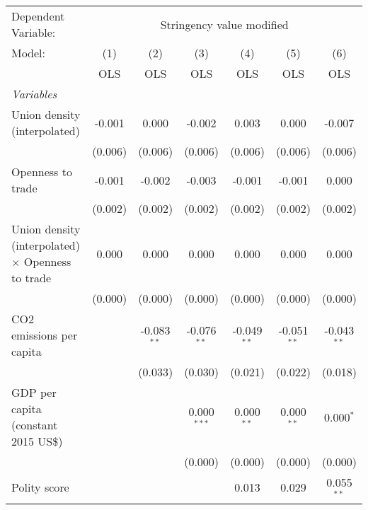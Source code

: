 
\begingroup
\centering
\begin{tabular}{lcccccc}
   \toprule
   Dependent Variable: & \multicolumn{6}{c}{Stringency value modified}\\
   Model:                                                   & (1)     & (2)           & (3)           & (4)           & (5)           & (6)\\  
                                                            &  OLS    & OLS           & OLS           & OLS           & OLS           & OLS\\  
   \midrule
   \emph{Variables}\\
   Union density (interpolated)                             & -0.001  & 0.000         & -0.002        & 0.003         & 0.000         & -0.007\\   
                                                            & (0.006) & (0.006)       & (0.006)       & (0.006)       & (0.006)       & (0.006)\\   
   Openness to trade                                        & -0.001  & -0.002        & -0.003        & -0.001        & -0.001        & 0.000\\   
                                                            & (0.002) & (0.002)       & (0.002)       & (0.002)       & (0.002)       & (0.002)\\   
   Union density (interpolated) $\times$ Openness to trade  & 0.000   & 0.000         & 0.000         & 0.000         & 0.000         & 0.000\\   
                                                            & (0.000) & (0.000)       & (0.000)       & (0.000)       & (0.000)       & (0.000)\\   
   CO2 emissions per capita                                 &         & -0.083$^{**}$ & -0.076$^{**}$ & -0.049$^{**}$ & -0.051$^{**}$ & -0.043$^{**}$\\   
                                                            &         & (0.033)       & (0.030)       & (0.021)       & (0.022)       & (0.018)\\   
   GDP per capita (constant 2015 US\$)                      &         &               & 0.000$^{***}$ & 0.000$^{**}$  & 0.000$^{**}$  & 0.000$^{*}$\\   
                                                            &         &               & (0.000)       & (0.000)       & (0.000)       & (0.000)\\   
   Polity score                                             &         &               &               & 0.013         & 0.029         & 0.055$^{**}$\\   

\end{tabular}

